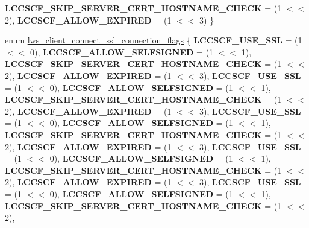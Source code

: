\begin{DoxyCompactItemize}
{\bfseries L\+C\+C\+S\+C\+F\+\_\+\+S\+K\+I\+P\+\_\+\+S\+E\+R\+V\+E\+R\+\_\+\+C\+E\+R\+T\+\_\+\+H\+O\+S\+T\+N\+A\+M\+E\+\_\+\+C\+H\+E\+CK} = (1 $<$$<$ 2), 
{\bfseries L\+C\+C\+S\+C\+F\+\_\+\+A\+L\+L\+O\+W\+\_\+\+E\+X\+P\+I\+R\+ED} = (1 $<$$<$ 3)
 \}
\item 
enum \hyperlink{group__client_ga96f3dbad54b2853969cfa933d66871ce}{lws\+\_\+client\+\_\+connect\+\_\+ssl\+\_\+connection\+\_\+flags} \{ \newline
{\bfseries L\+C\+C\+S\+C\+F\+\_\+\+U\+S\+E\+\_\+\+S\+SL} = (1 $<$$<$ 0), 
{\bfseries L\+C\+C\+S\+C\+F\+\_\+\+A\+L\+L\+O\+W\+\_\+\+S\+E\+L\+F\+S\+I\+G\+N\+ED} = (1 $<$$<$ 1), 
{\bfseries L\+C\+C\+S\+C\+F\+\_\+\+S\+K\+I\+P\+\_\+\+S\+E\+R\+V\+E\+R\+\_\+\+C\+E\+R\+T\+\_\+\+H\+O\+S\+T\+N\+A\+M\+E\+\_\+\+C\+H\+E\+CK} = (1 $<$$<$ 2), 
{\bfseries L\+C\+C\+S\+C\+F\+\_\+\+A\+L\+L\+O\+W\+\_\+\+E\+X\+P\+I\+R\+ED} = (1 $<$$<$ 3), 
\newline
{\bfseries L\+C\+C\+S\+C\+F\+\_\+\+U\+S\+E\+\_\+\+S\+SL} = (1 $<$$<$ 0), 
{\bfseries L\+C\+C\+S\+C\+F\+\_\+\+A\+L\+L\+O\+W\+\_\+\+S\+E\+L\+F\+S\+I\+G\+N\+ED} = (1 $<$$<$ 1), 
{\bfseries L\+C\+C\+S\+C\+F\+\_\+\+S\+K\+I\+P\+\_\+\+S\+E\+R\+V\+E\+R\+\_\+\+C\+E\+R\+T\+\_\+\+H\+O\+S\+T\+N\+A\+M\+E\+\_\+\+C\+H\+E\+CK} = (1 $<$$<$ 2), 
{\bfseries L\+C\+C\+S\+C\+F\+\_\+\+A\+L\+L\+O\+W\+\_\+\+E\+X\+P\+I\+R\+ED} = (1 $<$$<$ 3), 
\newline
{\bfseries L\+C\+C\+S\+C\+F\+\_\+\+U\+S\+E\+\_\+\+S\+SL} = (1 $<$$<$ 0), 
{\bfseries L\+C\+C\+S\+C\+F\+\_\+\+A\+L\+L\+O\+W\+\_\+\+S\+E\+L\+F\+S\+I\+G\+N\+ED} = (1 $<$$<$ 1), 
{\bfseries L\+C\+C\+S\+C\+F\+\_\+\+S\+K\+I\+P\+\_\+\+S\+E\+R\+V\+E\+R\+\_\+\+C\+E\+R\+T\+\_\+\+H\+O\+S\+T\+N\+A\+M\+E\+\_\+\+C\+H\+E\+CK} = (1 $<$$<$ 2), 
{\bfseries L\+C\+C\+S\+C\+F\+\_\+\+A\+L\+L\+O\+W\+\_\+\+E\+X\+P\+I\+R\+ED} = (1 $<$$<$ 3), 
\newline
{\bfseries L\+C\+C\+S\+C\+F\+\_\+\+U\+S\+E\+\_\+\+S\+SL} = (1 $<$$<$ 0), 
{\bfseries L\+C\+C\+S\+C\+F\+\_\+\+A\+L\+L\+O\+W\+\_\+\+S\+E\+L\+F\+S\+I\+G\+N\+ED} = (1 $<$$<$ 1), 
{\bfseries L\+C\+C\+S\+C\+F\+\_\+\+S\+K\+I\+P\+\_\+\+S\+E\+R\+V\+E\+R\+\_\+\+C\+E\+R\+T\+\_\+\+H\+O\+S\+T\+N\+A\+M\+E\+\_\+\+C\+H\+E\+CK} = (1 $<$$<$ 2), 
{\bfseries L\+C\+C\+S\+C\+F\+\_\+\+A\+L\+L\+O\+W\+\_\+\+E\+X\+P\+I\+R\+ED} = (1 $<$$<$ 3), 
\newline
{\bfseries L\+C\+C\+S\+C\+F\+\_\+\+U\+S\+E\+\_\+\+S\+SL} = (1 $<$$<$ 0), 
{\bfseries L\+C\+C\+S\+C\+F\+\_\+\+A\+L\+L\+O\+W\+\_\+\+S\+E\+L\+F\+S\+I\+G\+N\+ED} = (1 $<$$<$ 1), 
{\bfseries L\+C\+C\+S\+C\+F\+\_\+\+S\+K\+I\+P\+\_\+\+S\+E\+R\+V\+E\+R\+\_\+\+C\+E\+R\+T\+\_\+\+H\+O\+S\+T\+N\+A\+M\+E\+\_\+\+C\+H\+E\+CK} = (1 $<$$<$ 2), 
$$
\end{DoxyCompactItemize}
